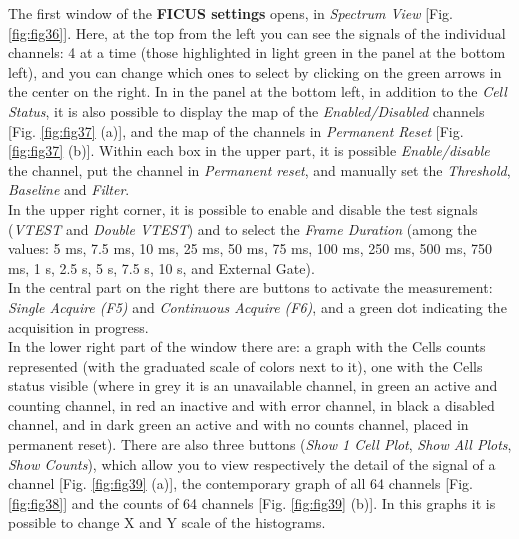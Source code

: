 \documentclass[a4paper,12pt,oneside,pdflatex,italian,final,twocolumn]{article}
\begin{document}
The first window of the \textbf{FICUS settings} opens, in \textit{Spectrum View} [Fig. \ref{fig:fig36}]. Here, at the top from the left you can see the signals of the individual channels: 4 at a time (those highlighted in light green in the panel at the bottom left), and you can change which ones to select by clicking on the green arrows in the center on the right. In in the panel at the bottom left, in addition to the \textit{Cell Status}, it is also possible to display the map of the \textit{Enabled/Disabled} channels [Fig. \ref{fig:fig37} (a)], and the map of the channels in \textit{Permanent Reset} [Fig. \ref{fig:fig37} (b)]. Within each box in the upper part, it is possible \textit{Enable/disable} the channel, put the channel in \textit{Permanent reset}, and manually set the \textit{Threshold}, \textit{Baseline} and \textit{Filter}. \\
In the upper right corner, it is possible to enable and disable the test signals (\textit{VTEST} and \textit{Double VTEST}) and to select the \textit{Frame Duration} (among the values: 5 ms, 7.5 ms, 10 ms, 25 ms, 50 ms, 75 ms, 100 ms, 250 ms, 500 ms, 750 ms, 1 s, 2.5 s, 5 s, 7.5 s, 10 s, and External Gate).\\
In the central part on the right there are buttons to activate the measurement: \textit{Single Acquire (F5)} and \textit{Continuous Acquire (F6)}, and a green dot indicating the acquisition in progress. \\
In the lower right part of the window there are: a graph with the Cells counts represented (with the graduated scale of colors next to it), one with the Cells status visible (where in grey it is an unavailable channel, in green an active and counting channel, in red an inactive and with error channel, in black a disabled channel, and in dark green an active and with no counts channel, placed in permanent reset). There are also three buttons (\textit{Show 1 Cell Plot}, \textit{Show All Plots}, \textit{Show Counts}), which allow you to view respectively the detail of the signal of a channel [Fig. \ref{fig:fig39} (a)], the contemporary graph of all 64 channels [Fig. \ref{fig:fig38}] and the counts of 64 channels [Fig. \ref{fig:fig39} (b)]. In this graphs it is possible to change X and Y scale of the histograms.
\end{document}
